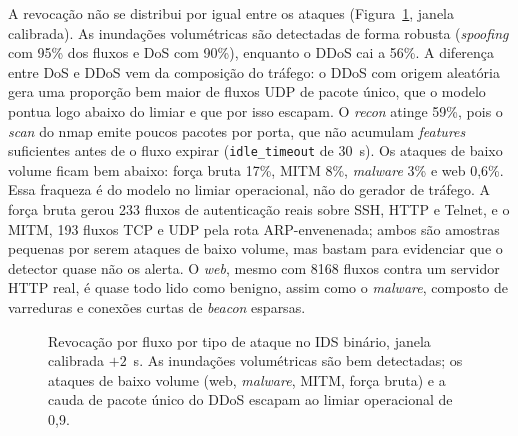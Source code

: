 \documentclass[12pt]{article}
\begin{document}
A revocação não se distribui por igual entre os ataques
(Figura~\ref{fig:detection_rate}, janela calibrada). As inundações volumétricas
são detectadas de forma robusta (\textit{spoofing} com 95\% dos fluxos e DoS
com 90\%), enquanto o DDoS cai a 56\%. A diferença entre DoS e DDoS vem da
composição do tráfego: o DDoS com origem aleatória gera uma proporção bem maior
de fluxos UDP de pacote único, que o modelo pontua logo abaixo do limiar e que
por isso escapam. O \textit{recon} atinge 59\%, pois o \textit{scan} do nmap
emite poucos pacotes por porta, que não acumulam \textit{features} suficientes
antes de o fluxo expirar (\texttt{idle\_timeout} de 30~s). Os ataques de baixo
volume ficam bem abaixo: força bruta 17\%, MITM 8\%, \textit{malware} 3\% e web
0,6\%. Essa fraqueza é do modelo no limiar operacional, não do gerador de tráfego.
A força bruta gerou 233 fluxos de autenticação reais sobre SSH, HTTP e Telnet, e
o MITM, 193 fluxos TCP e UDP pela rota ARP-envenenada; ambos são amostras
pequenas por serem ataques de baixo volume, mas bastam para evidenciar que o
detector quase não os alerta. O \textit{web}, mesmo com 8168 fluxos contra um
servidor HTTP real, é quase todo lido como benigno, assim como o \textit{malware},
composto de varreduras e conexões curtas de \textit{beacon} esparsas.

\begin{figure}[ht]
\centering
{}
\caption{Revocação por fluxo por tipo de ataque no IDS binário, janela calibrada
$+2$~s. As inundações volumétricas são bem detectadas; os ataques de baixo volume
(web, \textit{malware}, MITM, força bruta) e a cauda de pacote único do DDoS
escapam ao limiar operacional de 0,9.}
\label{fig:detection_rate}
\end{figure}
\end{document}
